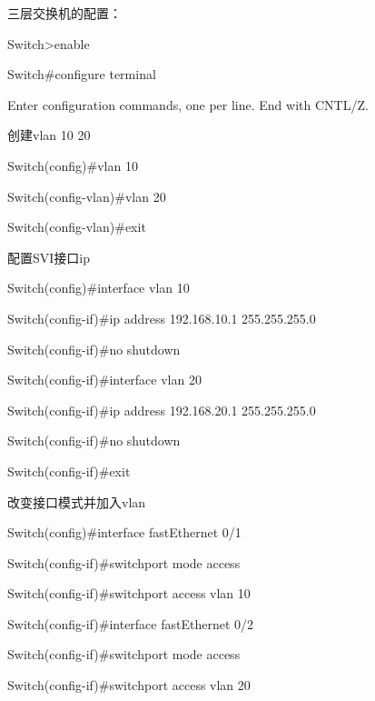 \documentclass[a4paper,12pt]{report}
\begin{document}
\begin{spacing}{1.5}
三层交换机的配置：

Switch>enable 

Switch\#configure terminal 

Enter configuration commands, one per line.  End with CNTL/Z.

创建vlan 10  20

Switch(config)\#vlan 10

Switch(config-vlan)\#vlan 20

Switch(config-vlan)\#exit

配置SVI接口ip

Switch(config)\#interface vlan 10


Switch(config-if)\#ip address 192.168.10.1 255.255.255.0

Switch(config-if)\#no shutdown 

Switch(config-if)\#interface vlan 20


Switch(config-if)\#ip address 192.168.20.1 255.255.255.0

Switch(config-if)\#no shutdown 

Switch(config-if)\#exit

改变接口模式并加入vlan

Switch(config)\#interface fastEthernet 0/1

Switch(config-if)\#switchport mode access 

Switch(config-if)\#switchport access vlan 10


Switch(config-if)\#interface fastEthernet 0/2

Switch(config-if)\#switchport mode access 

Switch(config-if)\#switchport access vlan 20



\end{spacing}
\end{document}
